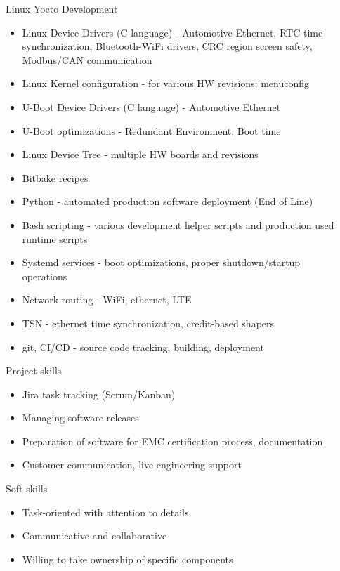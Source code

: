 \documentclass[10pt, a4paper]{article}
\begin{document}
Linux Yocto Development
\begin{itemize}
    \item Linux Device Drivers (C language) - Automotive Ethernet, RTC time synchronization, Bluetooth-WiFi drivers, CRC region screen safety,\\Modbus/CAN communication
    \item Linux Kernel configuration - for various HW revisions; menuconfig
    \item U-Boot Device Drivers (C language) - Automotive Ethernet
    \item U-Boot optimizations - Redundant Environment, Boot time
    \item Linux Device Tree - multiple HW boards and revisions
    \item Bitbake recipes
    \item Python - automated production software deployment (End of Line)
    \item Bash scripting - various development helper scripts and production used runtime scripts
    \item Systemd services - boot optimizations, proper shutdown/startup\\operations
    \item Network routing - WiFi, ethernet, LTE
    \item TSN - ethernet time synchronization, credit-based shapers
    \item git, CI/CD - source code tracking, building, deployment
\end{itemize}

Project skills
\begin{itemize}
    \item Jira task tracking (Scrum/Kanban)
    \item Managing software releases
    \item Preparation of software for EMC certification process, documentation
    \item Customer communication, live engineering support
\end{itemize}

Soft skills
\begin{itemize}
    \item Task-oriented with attention to details
    \item Communicative and collaborative
    \item Willing to take ownership of specific components
\end{itemize}

\fincols
\end{document}
